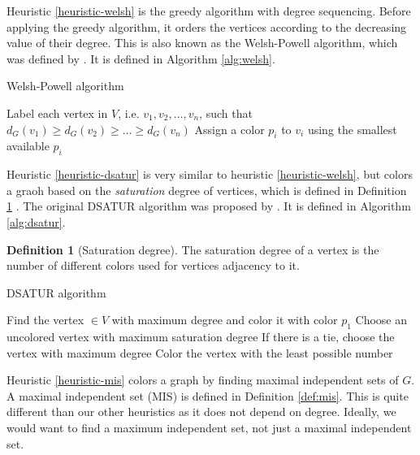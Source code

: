 \documentclass{article}
\newcounter{heuristic} \setcounter{heuristic}{0}
\theoremstyle{definition}
\newtheorem{definition}{Definition}
\begin{document}
\label{heuristic-welsh}

Heuristic \ref{heuristic-welsh} is the greedy algorithm with degree sequencing. Before applying the greedy algorithm, it orders the vertices according to the decreasing value of their degree. This is also known as the Welsh-Powell algorithm, which was defined by \citet{welsh}. It is defined in Algorithm \ref{alg:welsh}.

\begin{algorithm}
\caption{Welsh-Powell algorithm}\label{alg:welsh}
\begin{algorithmic}[1]
\State Label each vertex in $V$, i.e. $v_1, v_2, \dots, v_n$, such that $d_G(v_1) \geq d_G(v_2) \geq \dots \geq d_G(v_n)$
\State Assign a color $p_i$ to $v_i$ using the smallest available $p_i$
\EndFor
\end{algorithmic}
\end{algorithm}

\label{heuristic-dsatur}

Heuristic \ref{heuristic-dsatur} is very similar to heuristic \ref{heuristic-welsh}, but colors a graoh based on the \emph{saturation} degree of vertices, which is defined in Definition \ref{def:saturation} \cite{spinrad}. The original DSATUR algorithm was proposed by \citet{brelaz}. It is defined in Algorithm \ref{alg:dsatur}.

\begin{definition}[Saturation degree]\label{def:saturation}
The saturation degree of a vertex is the number of different colors used for vertices adjacency to it.
\end{definition}

\begin{algorithm}
\caption{DSATUR algorithm}\label{alg:dsatur}
\begin{algorithmic}[1]
\State Find the vertex $\in V$ with maximum degree and color it with color $p_1$
\State Choose an uncolored vertex with maximum saturation degree
\State If there is a tie, choose the vertex with maximum degree
\State Color the vertex with the least possible number
\EndWhile
\end{algorithmic}
\end{algorithm}

\label{heuristic-mis}

Heuristic \ref{heuristic-mis} colors a graph by finding maximal independent sets of \(G\). A maximal independent set (MIS) is defined in Definition \ref{def:mis}. This is quite different than our other heuristics as it does not depend on degree. Ideally, we would want to find a maximum independent set, not just a maximal independent set.
\end{document}
